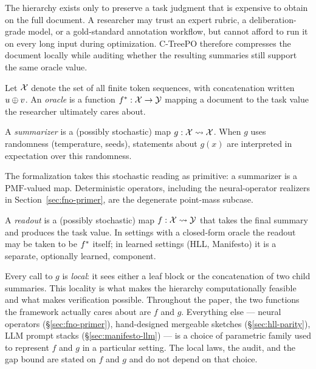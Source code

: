 The hierarchy exists only to preserve a task judgment that is expensive to obtain on the full document. A researcher may trust an expert rubric, a deliberation-grade model, or a gold-standard annotation workflow, but cannot afford to run it on every long input during optimization. C-TreePO therefore compresses the document locally while auditing whether the resulting summaries still support the same oracle value.

\begin{definition}[Oracle]\label{def:oracle}
Let $\mathcal{X}$ denote the set of all finite token sequences, with concatenation written $u \oplus v$. An \emph{oracle} is a function $f^\ast: \mathcal{X} \to \mathcal{Y}$ mapping a document to the task value the researcher ultimately cares about.
\end{definition}

\begin{definition}[Summarizer]\label{def:summarizer}
A \emph{summarizer} is a (possibly stochastic) map $g: \mathcal{X} \rightsquigarrow \mathcal{X}$. When $g$ uses randomness (temperature, seeds), statements about $g(x)$ are interpreted in expectation over this randomness.
\end{definition}

The formalization takes this stochastic reading as primitive: a summarizer is a $\mathrm{PMF}$-valued map. Deterministic operators, including the neural-operator realizers in Section~\ref{sec:fno-primer}, are the degenerate point-mass subcase.

\begin{definition}[Readout]\label{def:readout}
A \emph{readout} is a (possibly stochastic) map $f : \mathcal{X} \rightsquigarrow \mathcal{Y}$ that takes the final summary and produces the task value. In settings with a closed-form oracle the readout may be taken to be $f^\ast$ itself; in learned settings (HLL, Manifesto) it is a separate, optionally learned, component.
\end{definition}

Every call to $g$ is \emph{local}: it sees either a leaf block or the concatenation of two child summaries. This locality is what makes the hierarchy computationally feasible and what makes verification possible. Throughout the paper, the two functions the framework actually cares about are $f$ and $g$. Everything else --- neural operators (\S\ref{sec:fno-primer}), hand-designed mergeable sketches (\S\ref{sec:hll-parity}), LLM prompt stacks (\S\ref{sec:manifesto-llm}) --- is a choice of parametric family used to represent $f$ and $g$ in a particular setting. The local laws, the audit, and the gap bound are stated on $f$ and $g$ and do not depend on that choice.

